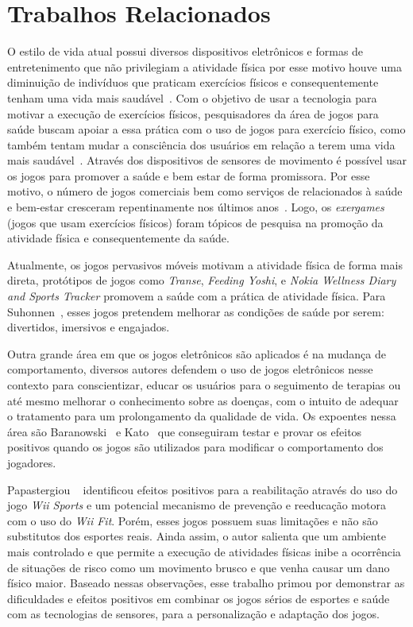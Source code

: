 \section{Trabalhos Relacionados}\label{section:jogos_saude}
O estilo de vida atual possui diversos dispositivos eletrônicos e formas de entretenimento que não privilegiam a atividade física por esse motivo houve uma diminuição de indivíduos que praticam exercícios físicos e consequentemente tenham uma vida mais saudável~\cite{maitland}. Com o objetivo de usar a tecnologia para motivar a execução de exercícios físicos, pesquisadores da área de jogos para saúde buscam apoiar a essa prática com o uso de jogos para exercício físico, como também tentam mudar a consciência dos usuários em relação a terem uma vida mais saudável~\cite{Suhonen:2008:SFE:1457199.1457204}. Através dos dispositivos de sensores de movimento é possível usar os jogos para promover a saúde e bem estar de forma promissora. Por esse motivo, o número de jogos comerciais bem como serviços de relacionados à saúde e bem-estar cresceram repentinamente nos últimos anos~\cite{Papastergiou:2009:EPC:1570538.1570707}. Logo, os \textit{exergames} (jogos que usam exercícios físicos) foram tópicos de pesquisa na promoção da atividade física e consequentemente da saúde.

Atualmente, os jogos pervasivos móveis motivam a atividade física de forma mais direta, protótipos de jogos como \textit{Transe}, \textit{Feeding Yoshi}, e  \textit{Nokia Wellness Diary and Sports Tracker} promovem a saúde com a prática de atividade física. Para Suhonnen~\cite{Suhonen:2008:SFE:1457199.1457204}, esses jogos pretendem melhorar as condições de saúde por serem: divertidos, imersivos e engajados.

Outra grande área em que os jogos eletrônicos são aplicados é na mudança de comportamento, diversos autores defendem o uso de jogos eletrônicos nesse contexto para conscientizar, educar os usuários para o seguimento de terapias ou até mesmo melhorar o conhecimento sobre as doenças, com o intuito de adequar o tratamento para um prolongamento da qualidade de vida. Os expoentes nessa área são Baranowski~\cite{baran08} e Kato~\cite{Kato:2008} que conseguiram testar e provar os efeitos positivos quando os jogos são utilizados para modificar o comportamento dos jogadores.

Papastergiou ~\cite{Papastergiou:2009:EPC:1570538.1570707} identificou efeitos positivos para a reabilitação através do uso do jogo \textit{Wii Sports} e um potencial mecanismo de prevenção e reeducação motora com o uso do \textit{Wii Fit}. Porém, esses jogos possuem suas limitações e não são substitutos dos esportes reais. Ainda assim, o autor salienta que um ambiente mais controlado e que permite a execução de atividades físicas inibe a ocorrência de situações de risco como um movimento brusco e que venha causar um dano físico maior. Baseado nessas observações, esse trabalho primou por demonstrar as dificuldades e efeitos positivos em combinar os jogos sérios de esportes e saúde com as tecnologias de sensores, para a personalização e adaptação dos jogos.

